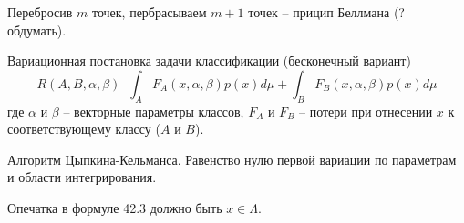 \documentclass[a4paper]{article}
\newcommand{\defn}{\mathop{\overset{\Delta}{=}}\nolimits}
\begin{document}
Перебросив $m$ точек, пербрасываем $m+1$ точек -- прицип Беллмана (? обдумать).


Вариационная постановка задачи классификации (бесконечный вариант)
\[R(A,B,\alpha,\beta)\defn \int_A F_A(x,\alpha,\beta) p(x) d\mu + \int_B F_B(x,\alpha,\beta) p(x) d\mu\]
где $\alpha$ и $\beta$ -- векторные параметры классов, $F_A$ и $F_B$ -- потери при отнесении $x$ к соответствующему классу ($A$ и $B$).

Алгоритм Цыпкина-Кельманса.
Равенство нулю первой вариации по параметрам и области интегрирования.

Опечатка в формуле 42.3 должно быть $x\in \Lambda$.







\end{document}
